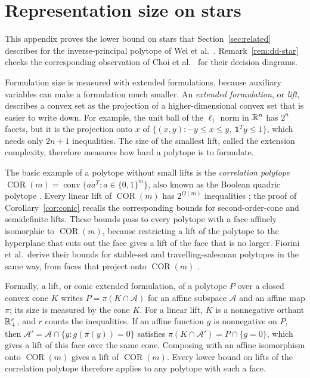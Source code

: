 \section{Representation size on stars}\label{sec:representation}
This appendix proves the lower bound on stars that
Section~\ref{sec:related} describes for the inverse-principal polytope
of Wei et al.\ \cite{WeiHull}. Remark~\ref{rem:dd-star} checks the
corresponding observation of Choi et al.\
\cite[Section~7.2]{ChoiDiagrams} for their decision diagrams.

Formulation size is measured with extended formulations, because
auxiliary variables can make a formulation much smaller. An
\emph{extended formulation}, or \emph{lift}, describes a convex set as
the projection of a higher-dimensional convex set that is easier to
write down. For example, the unit ball of the $\ell_1$ norm in $\mathbb R^n$
has $2^n$ facets, but it is the projection onto $x$ of
$\{(x,y):-y\le x\le y,\ \mathbf1^Ty\le1\}$, which needs only $2n+1$
inequalities. The size of the smallest lift, called the extension
complexity, therefore measures how hard a polytope is to formulate.

The basic example of a polytope without small lifts is the
\emph{correlation polytope}
$\operatorname{COR}(m)=\operatorname{conv}\{aa^T:a\in\{0,1\}^m\}$, also
known as the Boolean quadric polytope \cite[Section~3.2]{Fiorini}. Every
linear lift of $\operatorname{COR}(m)$ has $2^{\Omega(m)}$ inequalities
\cite[Theorem~7]{Fiorini}; the proof of Corollary~\ref{cor:conic}
recalls the corresponding bounds for second-order-cone and semidefinite
lifts. These bounds pass to every polytope with a face affinely
isomorphic to $\operatorname{COR}(m)$, because restricting a lift of the
polytope to the hyperplane that cuts out the face gives a lift of the
face that is no larger. Fiorini et al.\ derive their bounds for
stable-set and travelling-salesman polytopes in the same way, from faces
that project onto $\operatorname{COR}(m)$
\cite[Lemmas~8, 9, and~11]{Fiorini}.

Formally, a lift, or conic extended formulation, of a polytope $P$ over
a closed convex cone $K$ writes $P=\pi(K\cap\mathcal A)$ for an affine
subspace $\mathcal A$ and an affine map $\pi$; its size is measured by
the cone $K$. For a linear lift, $K$ is a nonnegative orthant $\mathbb R^r_+$,
and $r$ counts the inequalities. If an affine function $g$ is
nonnegative on $P$, then $\mathcal A'=\mathcal A\cap\{y:g(\pi(y))=0\}$
satisfies $\pi(K\cap\mathcal A')=P\cap\{g=0\}$, which gives a lift of
this face over the same cone. Composing with an affine isomorphism onto
$\operatorname{COR}(m)$ gives a lift of $\operatorname{COR}(m)$. Every
lower bound on lifts of the correlation polytope therefore applies to
any polytope with such a face.

